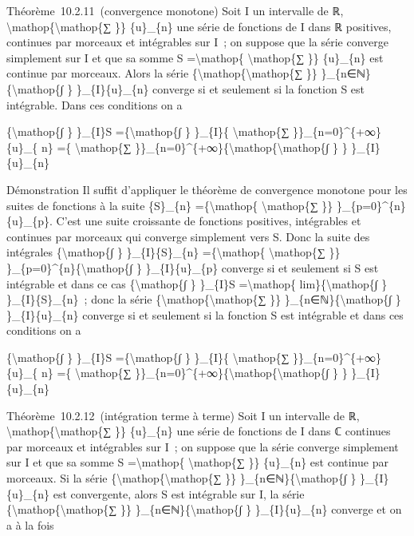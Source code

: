 \documentclass[]{article}
\begin{document}
Théorème~10.2.11~(convergence monotone) Soit I un intervalle de ℝ,
\textbackslash{}mathop\{\textbackslash{}mathop\{∑ \}\} \{u\}\_\{n\} une
série de fonctions de I dans ℝ positives, continues par morceaux et
intégrables sur I~; on suppose que la série converge simplement sur I et
que sa somme S =\textbackslash{}mathop\{ \textbackslash{}mathop\{∑ \}\}
\{u\}\_\{n\} est continue par morceaux. Alors la série
\{\textbackslash{}mathop\{\textbackslash{}mathop\{∑ \}\}
\}\_\{n∈ℕ\}\{\textbackslash{}mathop\{∫ \} \}\_\{I\}\{u\}\_\{n\} converge
si et seulement si la fonction S est intégrable. Dans ces conditions on
a

\{\textbackslash{}mathop\{∫ \} \}\_\{I\}S =\{\textbackslash{}mathop\{∫
\} \}\_\{I\}\{ \textbackslash{}mathop\{∑
\}\}\_\{n=0\}\^{}\{+∞\}\{u\}\_\{ n\} =\{ \textbackslash{}mathop\{∑
\}\}\_\{n=0\}\^{}\{+∞\}\{\textbackslash{}mathop\{\textbackslash{}mathop\{∫
\} \} \}\_\{I\}\{u\}\_\{n\}

Démonstration Il suffit d'appliquer le théorème de convergence monotone
pour les suites de fonctions à la suite \{S\}\_\{n\}
=\{\textbackslash{}mathop\{ \textbackslash{}mathop\{∑ \}\}
\}\_\{p=0\}\^{}\{n\}\{u\}\_\{p\}. C'est une suite croissante de
fonctions positives, intégrables et continues par morceaux qui converge
simplement vers S. Donc la suite des intégrales
\{\textbackslash{}mathop\{∫ \} \}\_\{I\}\{S\}\_\{n\}
=\{\textbackslash{}mathop\{ \textbackslash{}mathop\{∑ \}\}
\}\_\{p=0\}\^{}\{n\}\{\textbackslash{}mathop\{∫ \} \}\_\{I\}\{u\}\_\{p\}
converge si et seulement si S est intégrable et dans ce cas
\{\textbackslash{}mathop\{∫ \} \}\_\{I\}S =\textbackslash{}mathop\{
lim\}\{\textbackslash{}mathop\{∫ \} \}\_\{I\}\{S\}\_\{n\}~; donc la
série \{\textbackslash{}mathop\{\textbackslash{}mathop\{∑ \}\}
\}\_\{n∈ℕ\}\{\textbackslash{}mathop\{∫ \} \}\_\{I\}\{u\}\_\{n\} converge
si et seulement si la fonction S est intégrable et dans ces conditions
on a

\{\textbackslash{}mathop\{∫ \} \}\_\{I\}S =\{\textbackslash{}mathop\{∫
\} \}\_\{I\}\{ \textbackslash{}mathop\{∑
\}\}\_\{n=0\}\^{}\{+∞\}\{u\}\_\{ n\} =\{ \textbackslash{}mathop\{∑
\}\}\_\{n=0\}\^{}\{+∞\}\{\textbackslash{}mathop\{\textbackslash{}mathop\{∫
\} \} \}\_\{I\}\{u\}\_\{n\}

Théorème~10.2.12~(intégration terme à terme) Soit I un intervalle de ℝ,
\textbackslash{}mathop\{\textbackslash{}mathop\{∑ \}\} \{u\}\_\{n\} une
série de fonctions de I dans ℂ continues par morceaux et intégrables sur
I~; on suppose que la série converge simplement sur I et que sa somme S
=\textbackslash{}mathop\{ \textbackslash{}mathop\{∑ \}\} \{u\}\_\{n\}
est continue par morceaux. Si la série
\{\textbackslash{}mathop\{\textbackslash{}mathop\{∑ \}\}
\}\_\{n∈ℕ\}\{\textbackslash{}mathop\{∫ \}
\}\_\{I\}\textbar{}\{u\}\_\{n\}\textbar{} est convergente, alors S est
intégrable sur I, la série
\{\textbackslash{}mathop\{\textbackslash{}mathop\{∑ \}\}
\}\_\{n∈ℕ\}\{\textbackslash{}mathop\{∫ \} \}\_\{I\}\{u\}\_\{n\} converge
et on a à la fois
\end{document}
